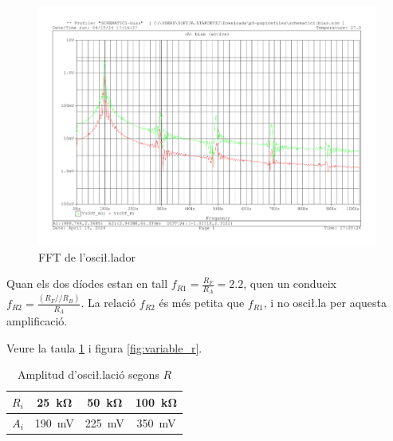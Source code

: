 \documentclass[catalan, a4paper, nobib]{tufte-handout}
\begin{document}
\begin{figure}[!h]
    \begin{center}
        \includegraphics[width=450px]{5.3.pdf}
    \end{center}
    \caption{FFT de l'osci\l.lador}
\end{figure}

 Quan els dos díodes estan en tall $f_{R1} = \frac{R_F}{R_A}=\num{2.2}$, quen un condueix $f_{R2} = \frac{(R_F//R_B)}{R_A}$. La relació $f_{R2}$ és més petita que $f_{R1}$, i no osci\l.la per aquesta amplificació.

 Veure la taula \ref{tab:variable_r} i figura \ref{fig:variable_r}.

\begin{table}[!h]
    \begin{center}
      \begin{tabular}{@{}rccc@{}}
        \toprule
        $R_i$ & \qty{25}{\kilo\ohm} & \qty{50}{\kilo\ohm} & \qty{100}{\kilo\ohm} \\
        \midrule
        $A_i$ & \qty{190}{\milli\volt} & \qty{225}{\milli\volt} & \qty{350}{\milli\volt} \\
        \bottomrule
      \end{tabular}
    \end{center}
    \caption{Amplitud d'osci\l.lació segons $R$}
    \label{tab:variable_r}
\end{table}

\newpage
\end{document}
